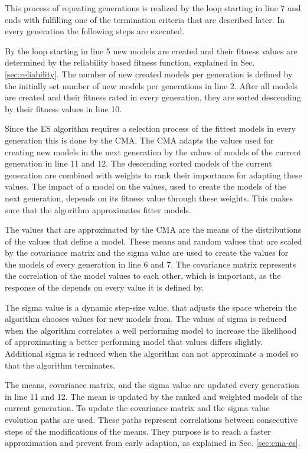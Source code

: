 This process of repeating generations is realized by the loop starting in line 7 and ends with fulfilling one of the termination criteria that are described later.
In every generation the following steps are executed.

By the loop starting in line 5 new models are created and their fitness values are determined by the reliability based fitness function, explained in Sec. \ref{sec:reliability}. %
The number of new created models per generation is defined by the initially set number of new models per generations in line 2.
After all models are created and their fitness rated in every generation, they are sorted descending by their fitness values in line 10.

Since the \ac{ES} algorithm requires a selection process of the fittest models in every generation this is done by the \ac{CMA}.
The \ac{CMA} adapts the values used for creating new models in the next generation by the values of models of the current generation in line 11 and 12. %
The descending sorted models of the current generation are combined with weights to rank their importance for adapting these values.
The impact of a model on the values, used to create the models of the next generation, depends on its fitness value through these weights.
This makes sure that the algorithm approximates fitter models.

The values that are approximated by the \ac{CMA} are the means of the distributions of the values that define a model.
These means and random values that are scaled by the covariance matrix and the sigma value are used to create the values for the models of every generation in line 6 and 7. %
The covariance matrix represents the correlation of the model values to each other, which is important, as the response of the \apuf depends on every value it is defined by. %

The sigma value is a dynamic step-size value, that adjusts the space wherein the algorithm chooses values for new models from.
The values of sigma is reduced when the algorithm correlates a well performing model to increase the likelihood of approximating a better performing model that values differs slightly. %
Additional sigma is reduced when the algorithm can not approximate a model so that the algorithm terminates.

The means, covariance matrix, and the sigma value are updated every generation in line 11 and 12.
The mean is updated by the ranked and weighted models of the current generation. %
To update the covariance matrix and the sigma value evolution paths are used.
These paths represent correlations between consecutive steps of the modifications of the means. They purpose is to reach a faster approximation and prevent from early adaption, as explained in Sec. \ref{sec:cma-es}.

